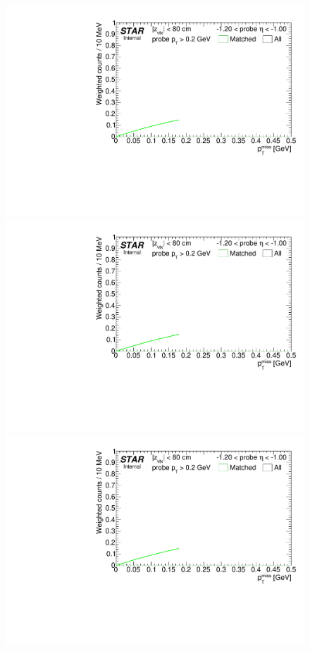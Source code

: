 \begin{figure}[ht]
{}~
\parbox{0.24\textwidth}{
  \centering
  \includegraphics[width=\linewidth,page=5]{graphics/correctionsToEff/TOF_tagAndProbe/Fitting_effVsEta_mc.CPT2.pdf}\\
  \includegraphics[width=\linewidth,page=7]{graphics/correctionsToEff/TOF_tagAndProbe/Fitting_effVsEta_mc.CPT2.pdf}\\
  \includegraphics[width=\linewidth,page=9]{graphics/correctionsToEff/TOF_tagAndProbe/Fitting_effVsEta_mc.CPT2.pdf}
}
\end{figure}
